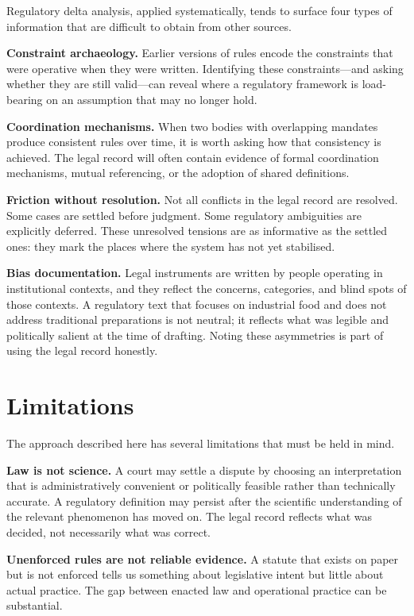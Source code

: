 \documentclass[12pt,a4paper]{article}
\begin{document}
Regulatory delta analysis, applied systematically, tends to surface four types of
information that are difficult to obtain from other sources.

\textbf{Constraint archaeology.} Earlier versions of rules encode the constraints
that were operative when they were written. Identifying these constraints---and
asking whether they are still valid---can reveal where a regulatory framework is
load-bearing on an assumption that may no longer hold.

\textbf{Coordination mechanisms.} When two bodies with overlapping mandates produce
consistent rules over time, it is worth asking how that consistency is achieved.
The legal record will often contain evidence of formal coordination mechanisms,
mutual referencing, or the adoption of shared definitions.

\textbf{Friction without resolution.} Not all conflicts in the legal record are
resolved. Some cases are settled before judgment. Some regulatory ambiguities are
explicitly deferred. These unresolved tensions are as informative as the settled
ones: they mark the places where the system has not yet stabilised.

\textbf{Bias documentation.} Legal instruments are written by people operating in
institutional contexts, and they reflect the concerns, categories, and blind spots
of those contexts. A regulatory text that focuses on industrial food and does not
address traditional preparations is not neutral; it reflects what was legible and
politically salient at the time of drafting. Noting these asymmetries is part of
using the legal record honestly.

\section{Limitations}

The approach described here has several limitations that must be held in mind.

\textbf{Law is not science.} A court may settle a dispute by choosing an
interpretation that is administratively convenient or politically feasible rather
than technically accurate. A regulatory definition may persist after the scientific
understanding of the relevant phenomenon has moved on. The legal record reflects
what was decided, not necessarily what was correct.

\textbf{Unenforced rules are not reliable evidence.} A statute that exists on paper
but is not enforced tells us something about legislative intent but little about
actual practice. The gap between enacted law and operational practice can be
substantial.
\end{document}
